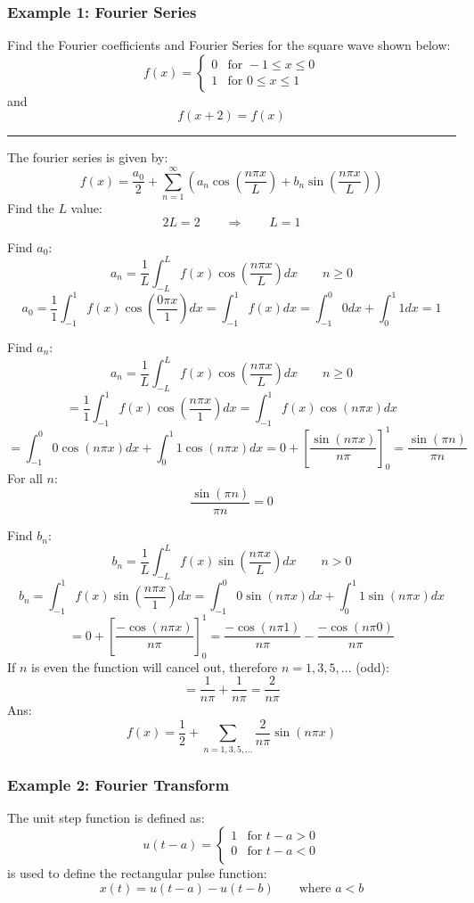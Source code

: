 \subsubsection{Example 1: Fourier Series}
Find the Fourier coefficients and Fourier Series for the square wave shown below:
$$f(x)=\begin{cases}
  0 &  \text{for }-1\leq x\leq0\\
  1 & \text{for }0\leq x\leq 1
\end{cases}$$
and
$$f(x+2)=f(x)$$


\rule{\textwidth}{0.5pt}

The fourier series is given by:
$$f(x)=\frac{a_{0}}{2}+\sum_{n=1}^{\infty}\left( a_{n}\cos\left( \frac{n\pi x}{L} \right)+b_{n}\sin\left( \frac{n\pi x}{L} \right) \right)$$
Find the $L$ value:
$$2L=2\qquad \Rightarrow \qquad L=1$$

Find $a_0$:
$$a_n  =\frac{1}{L} \int_{-L}^L f(x) \cos \left(\frac{n \pi x}{L}\right) d x\qquad   n \geq 0$$
$$a_0  =\frac{1}{1} \int_{-1}^1 f(x) \cos \left(\frac{0 \pi x}{1}\right) d x=\int_{-1}^1 f(x) d x=\int_{-1}^0 0 d x+\int_{0}^1 1 d x=1$$

Find $a_n$:
$$a_n  =\frac{1}{L} \int_{-L}^L f(x) \cos \left(\frac{n \pi x}{L}\right) d x\qquad   n \geq 0$$
$$=\frac{1}{1} \int_{-1}^1 f(x) \cos \left(\frac{n \pi x}{1}\right) d x=\int_{-1}^1 f(x) \cos \left(n \pi x\right) d x$$
$$=\int_{-1}^0 0 \cos \left(n \pi x\right) d x+\int_{0}^1 1 \cos \left(n \pi x\right) d x=0+\left[\frac{\sin(n\pi x)}{n\pi}\right]^1_0=\frac{\sin (\pi  n)}{\pi  n}$$
For all $n$:
$$\frac{\sin (\pi  n)}{\pi  n}=0$$

Find $b_n$:
$$b_n  =\frac{1}{L} \int_{-L}^L f(x) \sin \left(\frac{n \pi x}{L}\right) d x\qquad   n>0$$
$$b_n  =\int_{-1}^1 f(x) \sin \left(\frac{n \pi x}{1}\right) d x=\int_{-1}^0 0 \sin \left(n \pi x\right) d x+\int_{0}^1 1 \sin \left(n \pi x\right) d x$$
$$=0+\left[\frac{-\cos(n\pi x)}{n\pi}\right]^1_0=\frac{-\cos(n\pi 1)}{n\pi}-\frac{-\cos(n\pi 0)}{n\pi}$$
If $n$ is even the function will cancel out, therefore $n=1,3,5,\dots$ (odd):
$$=\frac{1}{n\pi}+\frac{1}{n\pi}=\frac{2}{n\pi}$$
Ans:
$$f(x)=\frac{1}{2}+\sum_{n=1,3,5,\dots}\frac{2}{n\pi}\sin(n\pi x)$$
\subsubsection{Example 2: Fourier Transform}
The unit step function is defined as:
$$u(t-a)=\begin{cases}
  1&  \text{for }t-a>0\\
  0&  \text{for }t-a<0\\
\end{cases}$$
is used to define the rectangular pulse function:
$$x(t)=u(t-a)-u(t-b)\qquad \text{where }a<b$$


